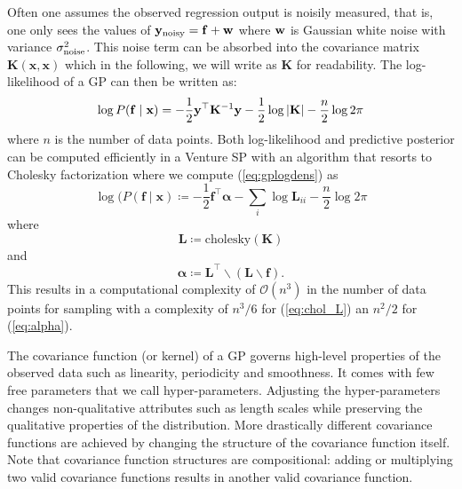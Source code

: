 Often one assumes the observed regression output is noisily measured, that is, one only sees the values of $\mathbf{y}_{\textrm{noisy}} = \mathbf{f}+ \mathbf{w}$ where $\mathbf{w}$ is Gaussian white noise with variance $\sigma_{\textrm{noise}}^2$. This noise term can be absorbed into the covariance matrix $\mathbf{K}(\mathbf{x},\mathbf{x})$ which in the following, we will write as $\mathbf{K}$ for readability. The log-likelihood of a \ac{GP} can then be written as:
\begin{equation}
\label{eq:gplogdens}
\log P(\mathbf{f} \mid \mathbf{x}) =
-\frac12 \mathbf{y}^\top 
\mathbf{K}^{-1} \mathbf{y}
- \frac12\log \left\lvert \mathbf{K} \right\rvert
- \frac{n}{2}\log 2\pi
\end{equation}
where $n$ is the number of data points.
Both log-likelihood and predictive posterior can be computed efficiently in a Venture SP with an algorithm that resorts to Cholesky factorization\citep[chap. 2]{rasmussen2006gaussian} where 
we compute (\ref{eq:gplogdens}) as
\begin{equation}
\log(P(\mathbf{f}\mid \mathbf{x})\coloneqq - \frac{1}{2} \mathbf{f}^\top \bm{\alpha} - \sum_i \log \mathbf{L}_{ii} - \frac{n}{2} \log 2 \pi
\end{equation}
where 
\begin{equation}
\label{eq:chol_L}
\mathbf{L} \coloneqq \text{cholesky}(\mathbf{K})
\end{equation}
and 
\begin{equation}
\label{eq:alpha}
\bm{\alpha} \coloneqq  \mathbf{L}^\top \backslash(\mathbf{L} \backslash \mathbf{f}). 
\end{equation}
This results in a computational complexity of $\mathcal{O}(n^3)$ in the number of data points for
sampling with a complexity of $n^3/6$ for (\ref{eq:chol_L}) an $n^2/2$ for (\ref{eq:alpha}). 



The covariance function (or kernel) of a \ac{GP} governs high-level properties of the observed data such as linearity, periodicity and smoothness.
It comes with few free parameters that we call hyper-parameters.
Adjusting the hyper-parameters changes non-qualitative attributes such as length
scales while preserving the qualitative properties of the distribution.
More drastically different covariance functions are achieved by changing the structure of the covariance function itself.
Note that covariance function structures are compositional: adding or multiplying two valid covariance functions results in another valid covariance function. 







